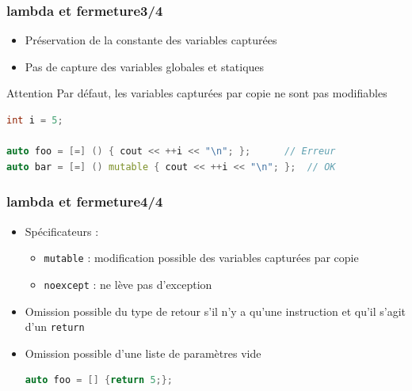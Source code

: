 \documentclass[C++.tex]{subfiles}
\begin{document}
\begin{frame}[fragile]
	\frametitle{lambda et fermeture\titlehfill{}3/4}
	\begin{itemize}
		\item Préservation de la constante des variables capturées


		\item Pas de capture des variables globales et statiques

	\end{itemize}

	\begin{alertblock}{Attention}
		Par défaut, les variables capturées par copie ne sont pas modifiables
	
		\begin{lstlisting}[language=C++]
int i = 5;
	
auto foo = [=] () { cout << ++i << "\n"; };      // Erreur
auto bar = [=] () mutable { cout << ++i << "\n"; };  // OK\end{lstlisting}
	
	\end{alertblock}
\end{frame}

\begin{frame}[fragile]
	\frametitle{lambda et fermeture\titlehfill{}4/4}
	\begin{itemize}
		\item Spécificateurs :
		\begin{itemize}
			\item \lstinline|mutable| : modification possible des variables capturées par copie
			\item \lstinline|noexcept| : ne lève pas d'exception
		\end{itemize}

		\item Omission possible du type de retour s'il n'y a qu'une instruction et qu'il s'agit d'un \lstinline|return|
	
	
		\item Omission possible d'une liste de paramètres vide


\begin{lstlisting}[language=C++]
auto foo = [] {return 5;};\end{lstlisting}
	\end{itemize}
\end{frame}
\end{document}

